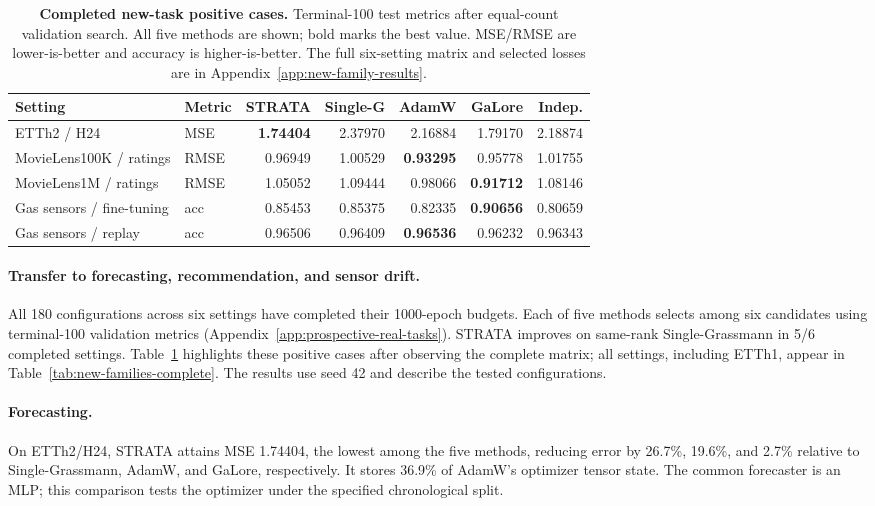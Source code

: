 \begin{table}[t]\centering\footnotesize\setlength{\tabcolsep}{4pt}
\caption{\textbf{Completed new-task positive cases.} Terminal-100 test metrics after equal-count validation search. All five methods are shown; bold marks the best value. MSE/RMSE are lower-is-better and accuracy is higher-is-better. The full six-setting matrix and selected losses are in Appendix~\ref{app:new-family-results}.}
\label{tab:new-task-positive}\begin{adjustbox}{max width=\linewidth}
\begin{tabular}{llrrrrr}\toprule Setting & Metric & STRATA & Single-G & AdamW & GaLore & Indep.\\\midrule
ETTh2 / H24 & MSE & \cellcolor{oursbg}\textbf{1.74404} & 2.37970 & 2.16884 & 1.79170 & 2.18874 \\
MovieLens100K / ratings & RMSE & \cellcolor{oursbg}0.96949 & 1.00529 & \textbf{0.93295} & 0.95778 & 1.01755 \\
MovieLens1M / ratings & RMSE & \cellcolor{oursbg}1.05052 & 1.09444 & 0.98066 & \textbf{0.91712} & 1.08146 \\
Gas sensors / fine-tuning & acc & \cellcolor{oursbg}0.85453 & 0.85375 & 0.82335 & \textbf{0.90656} & 0.80659 \\
Gas sensors / replay & acc & \cellcolor{oursbg}0.96506 & 0.96409 & \textbf{0.96536} & 0.96232 & 0.96343 \\
\bottomrule\end{tabular}\end{adjustbox}\end{table}
\paragraph{Transfer to forecasting, recommendation, and sensor drift.} All 180 configurations across six settings have completed their 1000-epoch budgets. Each of five methods selects among six candidates using terminal-100 validation metrics (Appendix~\ref{app:prospective-real-tasks}). STRATA improves on same-rank Single-Grassmann in 5/6 completed settings. Table~\ref{tab:new-task-positive} highlights these positive cases after observing the complete matrix; all settings, including ETTh1, appear in Table~\ref{tab:new-families-complete}. The results use seed 42 and describe the tested configurations.
\paragraph{Forecasting.} On ETTh2/H24, STRATA attains MSE 1.74404, the lowest among the five methods, reducing error by 26.7\%, 19.6\%, and 2.7\% relative to Single-Grassmann, AdamW, and GaLore, respectively. It stores 36.9\% of AdamW's optimizer tensor state. The common forecaster is an MLP; this comparison tests the optimizer under the specified chronological split.
